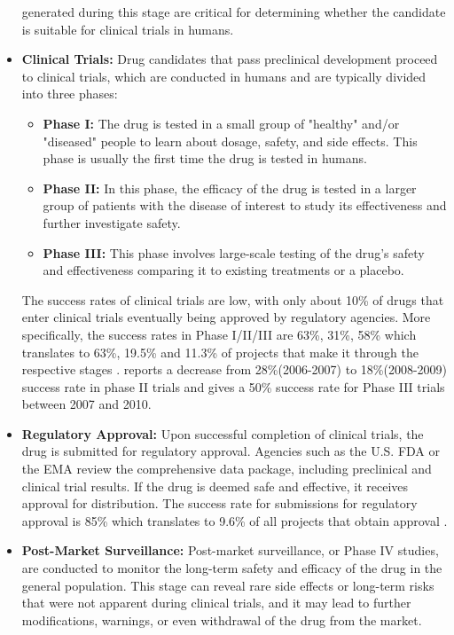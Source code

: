 \begin{itemize}
	      generated during this stage are critical for determining whether the candidate is
	      suitable for clinical trials in humans.
	\item \textbf{Clinical Trials:} Drug candidates that pass preclinical development proceed to
	      clinical trials, which are conducted in humans and are typically divided into three phases:
	      \begin{itemize}
		      \item \textbf{Phase I:} The drug is tested in a small group of "healthy" and/or "diseased" people to learn about
		            dosage, safety, and side effects. This phase is usually the first time the drug is tested in humans.
		      \item \textbf{Phase II:} In this phase, the efficacy of the drug is tested in a larger
		            group of patients with the disease of interest to study its effectiveness and further investigate safety.
		      \item \textbf{Phase III:} This phase involves large-scale testing of the drug's safety
		            and effectiveness comparing it to existing treatments or a placebo.
	      \end{itemize}
	      The success rates of clinical trials are low, with only about 10\% of drugs that enter clinical
	      trials eventually being approved by regulatory agencies. More specifically, the success rates in
	      Phase I/II/III are 63\%, 31\%, 58\% which translates to 63\%, 19.5\% and 11.3\% of projects that
	      make it through the respective stages \citep{mullardParsingClinicalSuccess2016}. \citet{arrowsmithPhaseIIFailures2011}
		  reports a decrease from 28\%(2006-2007) to 18\%(2008-2009) success rate in phase II trials and \citet{arrowsmithPhaseIIISubmission2011}
		  gives a 50\% success rate for Phase III trials between 2007 and 2010.
	\item \textbf{Regulatory Approval:} Upon successful completion of clinical trials, the drug is
	      submitted for regulatory approval. Agencies such as the U.S. \Ac{FDA} or the \Ac{EMA}
	      review the comprehensive data package, including preclinical and clinical trial results.
	      If the drug is deemed safe and effective, it receives approval for distribution. The
	      success rate for submissions for regulatory approval is 85\% which translates to 9.6\% of
	      all projects that obtain approval \citep{mullardParsingClinicalSuccess2016}.
	\item \textbf{Post-Market Surveillance:} Post-market surveillance, or Phase IV studies, are
	      conducted to monitor the long-term safety and efficacy of the drug in the general population.
	      This stage can reveal rare side effects or long-term risks that were not apparent during
	      clinical trials, and it may lead to further modifications, warnings, or even withdrawal of the
	      drug from the market.
\end{itemize}

